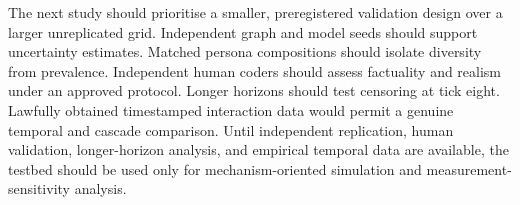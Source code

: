 The next study should prioritise a smaller, preregistered validation design
over a larger unreplicated grid. Independent graph and model seeds should
support uncertainty estimates. Matched persona compositions should isolate
diversity from prevalence. Independent human coders should assess factuality
and realism under an approved protocol. Longer horizons should test censoring
at tick eight. Lawfully obtained timestamped interaction data would permit a
genuine temporal and cascade comparison. Until independent replication, human
validation, longer-horizon analysis, and empirical temporal data are
available, the testbed should be used only for mechanism-oriented simulation
and measurement-sensitivity analysis.
